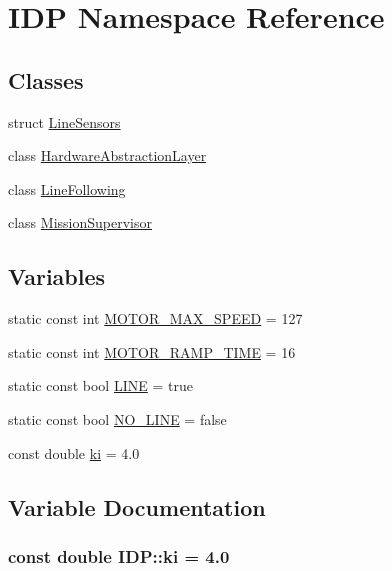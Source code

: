 \hypertarget{namespaceIDP}{
\section{IDP Namespace Reference}
\label{namespaceIDP}
}
\subsection*{Classes}
\begin{CompactItemize}
\item 
struct \hyperlink{structIDP_1_1LineSensors}{LineSensors}
\item 
class \hyperlink{classIDP_1_1HardwareAbstractionLayer}{HardwareAbstractionLayer}
\item 
class \hyperlink{classIDP_1_1LineFollowing}{LineFollowing}
\item 
class \hyperlink{classIDP_1_1MissionSupervisor}{MissionSupervisor}
\end{CompactItemize}
\subsection*{Variables}
\begin{CompactItemize}
\item 
static const int \hyperlink{namespaceIDP_4ead0b21ad2c507b542445695182d4cd}{MOTOR\_\-MAX\_\-SPEED} = 127
\item 
static const int \hyperlink{namespaceIDP_b3a00a6cc8a6dba271e38d337daf4703}{MOTOR\_\-RAMP\_\-TIME} = 16
\item 
static const bool \hyperlink{namespaceIDP_559427fa7c37f2edc0a43a4b793c4fdc}{LINE} = true
\item 
static const bool \hyperlink{namespaceIDP_5ea027b77276a637783f68955303b9b8}{NO\_\-LINE} = false
\item 
const double \hyperlink{namespaceIDP_a2b933f600179026dbca5d8bc63c3baf}{ki} = 4.0
\end{CompactItemize}


\subsection{Variable Documentation}
\hypertarget{namespaceIDP_a2b933f600179026dbca5d8bc63c3baf}{
\subsubsection[{ki}]{\setlength{\rightskip}{0pt plus 5cm}const double {\bf IDP::ki} = 4.0}}
\label{namespaceIDP_a2b933f600179026dbca5d8bc63c3baf}


